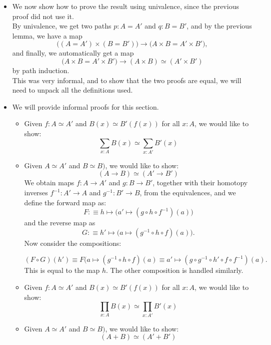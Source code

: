 \documentclass[14pt]{extarticle}
\newcommand{\0}{{\mathbf 0}}
\newcommand{\1}{{\mathbf 1}}
\newcommand{\2}{{\mathbf 2}}
\newcommand{\mt}{\mapsto}
\begin{document}
\begin{itemize}
\item [(ii)] We now show how to prove the result using univalence, since the previous proof did not use it.\\
By univalence, we get two paths $p : A = A'$ and $q : B = B'$, and by the previous lemma, we have a map
\[\Big((A = A') \times (B = B')\Big) \to \Big(A\times B = A' \times B' \Big),\] and finally, we automatically get a map \[\Big(A\times B = A' \times B' \Big) \to (A \times B) \simeq (A' \times B')\] by path induction. \\
This was very informal, and to show that the two proofs are equal, we will need to unpack all the definitions used.
\item [(iii)]
We will provide informal proofs for this section.
\begin{itemize}
\item {} Given $f : A \simeq A'$ and $B(x) \simeq B'(f(x))$ for all $x : A$, we would like to show:
\[\sum_{x:A}B(x) \simeq \sum_{x:A'}B'(x)\] 

\item {} Given $A \simeq A'$ and $B \simeq B)$, we would like to show:
\[(A \to B) \simeq (A' \to B')\]
We obtain maps $f : A \to A'$ and $g : B \to B'$, together with their homotopy inverses $f^{-1} : A' \to A$ and $g^{-1} : B' \to B$, from the equivalences, and we define the forward map as:
\[F :\equiv h \mt \Big(a' \mt (g \circ h \circ f^{-1})(a)\Big)\] and the reverse map as 
\[G : \equiv h' \mt \Big(a \mt (g^{-1}\circ h \circ f)(a)\Big).\] Now consider the compositions:

\[(F \circ G)(h') \equiv F(a \mt (g^{-1}\circ h \circ f)(a) \equiv a' \mt (g \circ g^{-1} \circ h' \circ f \circ f^{-1})(a).\] This is equal to the map $h$. The other composition is handled similarly.

\item {} Given $f : A \simeq A'$ and $B(x) \simeq B'(f(x))$ for all $x : A$, we would like to show:
\[\prod_{x:A}B(x) \simeq \prod_{x : A'}B'(x)\]

\item {} Given $A \simeq A'$ and $B \simeq B)$, we would like to show:
\[(A + B) \simeq (A' + B')\]
\end{itemize}

\end{itemize}
\end{document}
